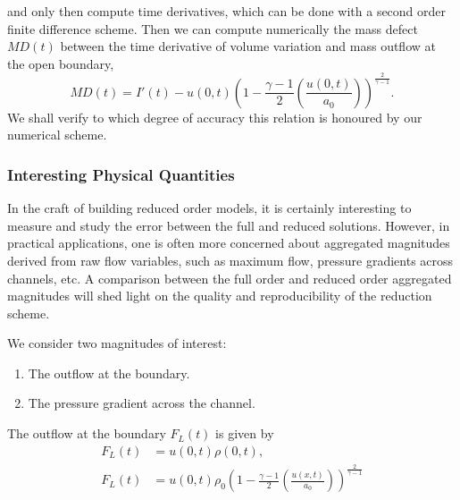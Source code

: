 \documentclass[../../thesis.tex]{subfiles}
\newcommand{\dt}{\ensuremath{\Delta t}}
\begin{document}
and only then compute time derivatives, which can be done with a second order finite difference scheme.
Then we can compute numerically the mass defect $MD(t)$ between the time derivative of volume variation
and mass outflow at the open boundary,
\begin{equation}
    MD(t) = I'(t) - u(0,t) \left(1 - \frac{\gamma-1}{2}\left(\frac{u(0,t)}{a_0}\right)\right)^{\frac{2}{\gamma-1}}.
    \label{eq:mass_conservation_check}
\end{equation}
We shall verify to which degree of accuracy this relation is honoured by our numerical scheme.


\subsubsection{Interesting Physical Quantities}
In the craft of building reduced order models, it is certainly interesting to measure and study the error between the full and reduced solutions. 
However, in practical applications, one is often more concerned about aggregated magnitudes derived from raw flow variables, such as maximum flow, pressure gradients across channels, etc. 
A comparison between the full order and reduced order aggregated magnitudes will shed light on the quality and reproducibility of the reduction scheme.

We consider two magnitudes of interest:
\begin{enumerate}
    \item The outflow at the boundary.
    \item The pressure gradient across the channel.
\end{enumerate}
The outflow at the boundary $F_L(t)$ is given by
\begin{subequations}
    \begin{align}
        F_L(t) &= u(0,t) \rho(0,t),
        \label{eq:outflow_at_the_boundary}
        \\  
        F_L(t) &= u(0,t) \rho_0 \left(1 - \frac{\gamma-1}{2}\left(\frac{u(x,t)}{a_0}\right)\right)^{\frac{2}{\gamma-1}}
    \end{align}
\end{subequations}
\end{document}

